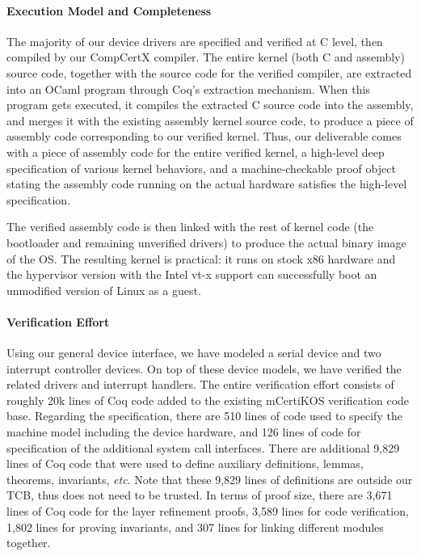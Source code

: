 \paragraph{Execution Model and Completeness}
The majority of our device drivers are specified and verified at C
level, then compiled by our CompCertX compiler. 
The entire kernel (both C and assembly)
source code, together with the source code for the verified compiler,
are extracted into an OCaml program through Coq's extraction
mechanism. When this program gets executed, it compiles the extracted
C source code into the assembly, and merges it with the existing
assembly kernel source code, to produce a piece of assembly code
corresponding to our verified kernel.  Thus, our deliverable comes
with a piece of assembly code for the entire verified kernel, a high-level
deep specification of various kernel behaviors, and a machine-checkable
proof object stating the assembly code running on the actual
hardware satisfies the high-level specification.

The verified assembly code is then linked with the rest of kernel code
(the bootloader and remaining unverified drivers) to produce the
actual binary image of the OS. The resulting kernel is practical: it
runs on stock x86 hardware and the hypervisor version with the Intel vt-x
support can successfully boot an unmodified version of Linux as a guest.

\paragraph{Verification Effort} 
Using our general device interface, we have modeled a serial device
and two interrupt controller devices. On top of these device models,
we have verified the related drivers and interrupt handlers.  The
entire verification effort consists of roughly 20k lines of Coq code
added to the existing mCertiKOS verification code base.  Regarding the
specification, there are 510 lines of code used to specify the machine
model including the device hardware, and 126 lines of code for
specification of the additional system call interfaces. There are
additional 9,829 lines of Coq code that were used to define auxiliary
definitions, lemmas, theorems, invariants, {\it{}etc}. Note that these
9,829 lines of definitions are outside our TCB, thus does not need
to be trusted.  In terms of proof size, there are 3,671 lines of Coq
code for the layer refinement proofs, 3,589 lines for code
verification, 1,802 lines for proving invariants, and 307 lines for
linking different modules together.

